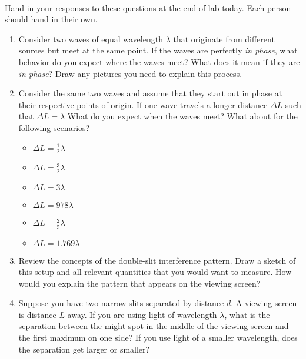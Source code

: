\documentclass{tufte-handout}
\begin{document}



\vspace{0.5cm}
\\
\vspace{0.5cm}

Hand in your responses to these questions at the end of lab today. Each person should hand in their own.

\begin{enumerate}

\item Consider two waves of equal wavelength $\lambda$ that originate from 
different sources but meet at the same point.
If the waves are perfectly {\it in phase}, what behavior do you expect where the waves meet?
What does it mean if they are {\it in phase}? Draw any pictures you need to explain this process.

\item Consider the same two waves and assume that they start out in phase at their respective
points of origin. If one wave travels a longer distance $\Delta L$ such that $\Delta L = \lambda$
What do you expect when the waves meet? What about for the following scenarios?
\begin{itemize}[itemsep=0pt,parsep=0pt,topsep=0pt,partopsep=0pt]
    \item $\Delta L = \frac{1}{2}\lambda$
    \item $\Delta L = \frac{3}{2}\lambda$
    \item $\Delta L = 3\lambda$
    \item $\Delta L = 978\lambda$
    \item $\Delta L = \frac{2}{5}\lambda$
    \item $\Delta L = 1.769\lambda$
\end{itemize}

\item Review the concepts of the double-slit interference pattern. Draw a sketch of this setup and
all relevant quantities that you would want to measure. How would you explain the pattern that appears on the 
viewing screen?

\item Suppose you have two narrow slits separated by distance $d$. A viewing screen is distance $L$ away. If you are
using light of wavelength $\lambda$, what is the separation between the might spot in the middle of
the viewing screen and the first maximum on one side? If you use light of a smaller wavelength, does
the separation get larger or smaller?


\end{enumerate}
\end{document}
